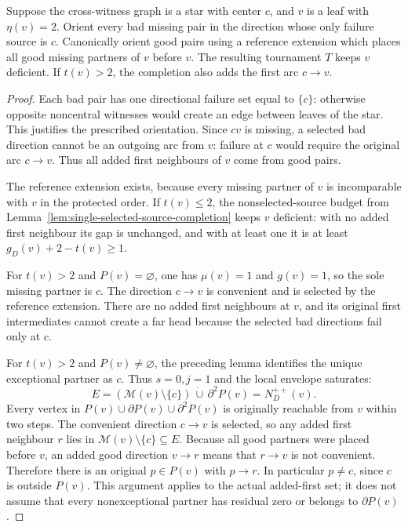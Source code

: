 \begin{lemma}
\label{lem:eta-two-leaf-completion}
Suppose the cross-witness graph is a star with center $c$, and $v$ is
a leaf with $\eta(v)=2$. Orient every bad missing pair in the direction
whose only failure source is $c$. Canonically orient good pairs using
a reference extension which places all good missing partners of $v$
before $v$. The resulting tournament $T$ keeps $v$ deficient.
If $t(v)>2$, the completion also adds the first arc $c\to v$.
\end{lemma}
\begin{proof}
Each bad pair has one directional failure set equal to $\{c\}$:
otherwise opposite noncentral witnesses would create an edge between
leaves of the star. This justifies the prescribed orientation.
Since $cv$ is missing, a selected bad direction cannot be an outgoing
arc from $v$: failure at $c$ would require the original arc $c\to v$.
Thus all added first neighbours of $v$ come from good pairs.

The reference extension exists, because every missing partner of $v$
is incomparable with $v$ in the protected order. If $t(v)\le2$, the
nonselected-source budget from
Lemma~\ref{lem:single-selected-source-completion} keeps $v$ deficient:
with no added first neighbour its gap is unchanged, and with at least
one it is at least $g_D(v)+2-t(v)\ge1$.

For $t(v)>2$ and $P(v)=\varnothing$, one has $\mu(v)=1$ and $g(v)=1$,
so the sole missing partner is $c$. The direction $c\to v$ is
convenient and is selected by the reference extension. There are no
added first neighbours at $v$, and its original first intermediates
cannot create a far head because the selected bad directions fail
only at $c$.

For $t(v)>2$ and $P(v)\ne\varnothing$, the preceding lemma identifies
the unique exceptional partner as $c$. Thus $s=0,j=1$ and the local
envelope saturates:
\[
 E=(\mathcal M(v)\setminus\{c\})\,\dot\cup\,\partial^2P(v)
   =N_D^{++}(v).
\]
Every vertex in $P(v)\cup\partial P(v)\cup\partial^2P(v)$ is
originally reachable from $v$ within two steps. The convenient
direction $c\to v$ is selected, so any added first neighbour
$r$ lies in $\mathcal M(v)\setminus\{c\}\subseteq E$.
Because all good partners were placed before $v$, an added good
direction $v\to r$ means that $r\to v$ is not convenient. Therefore
there is an original $p\in P(v)$ with $p\to r$.
In particular $p\ne c$, since $c$ is outside $P(v)$.
This argument applies to the actual added-first set; it does not
assume that every nonexceptional partner has residual zero or belongs
to $\partial P(v)$.


\end{proof}
